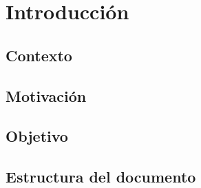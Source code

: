 \section{Introducción}

\subsection{Contexto}


\subsection{Motivación}


\subsection{Objetivo}


\subsection{Estructura del documento}

\newpage



